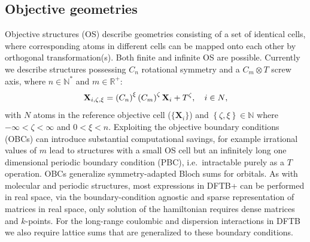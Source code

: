 \documentclass[reprint,onecolumn,superscriptaddress]{revtex4-1}
\newcommand{\dftbp}{DFTB+}
\begin{document}
\subsection{Objective geometries}

Objective structures\cite{James2006} (OS) describe geometries consisting of a
set of identical cells, where corresponding atoms in different cells can be
mapped onto each other by orthogonal transformation(s). Both finite and infinite
OS are possible. Currently we describe
structures\cite{James2006,Dumitrica2007,ZhangHuaDumitrica2008}
possessing $C_n$ rotational symmetry and a $C_m \otimes T$ screw axis, where $n
\in \mathbb{N}^{*}$ and $m \in \mathbb{R}^{+}$:
\begin{equation}
  \mathbf{X}_{i, \zeta, \xi} =
  \left(C_n\right)^\xi \left(C_m\right)^\zeta \mathbf{X}_{i}+ T^\zeta,\quad{i \in N},
  \label{basic_replicate_obj}
\end{equation}
with $N$ atoms in the reference objective cell ($\{\mathbf{X}_i\}$) and
$\left\{\zeta,\xi\right\} \in \mathbb{N}$ where $-\infty < \zeta < \infty$ and
$0 < \xi < n$. Exploiting the objective boundary conditions (OBCs) can introduce
substantial computational savings, for example irrational values of $m$ lead to
structures with a small OS cell but an infinitely long one dimensional periodic
boundary condition (PBC), i.e.\ intractable purely as a $T$ operation. OBCs
generalize symmetry-adapted Bloch sums for orbitals. As with molecular and
periodic structures,\cite{aradi-jpca-2007} most expressions in \dftbp{} can be
performed in real space, via the boundary-condition agnostic and sparse
representation of matrices in real space, only solution of the hamiltonian
requires dense matrices and $k$-points. For the long-range coulombic and
dispersion interactions in DFTB we also require lattice sums that are
generalized to these boundary conditions.\cite{Nikiforov2013}
\end{document}
